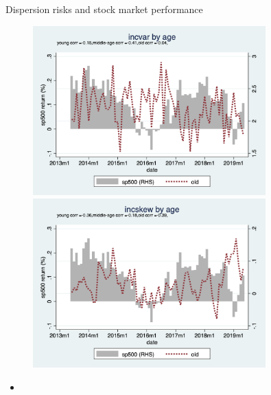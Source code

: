 \documentclass{beamer}
\begin{document}
\begin{frame}{Dispersion risks and stock market performance}
	\begin{figure}
		\centering
		\label{ts_stk_age_g}
		\includegraphics[width=0.8\textwidth, height=\0.4\textheight]{figures/ts_incvar_age_g_mean_stk} \\
		\includegraphics[width=0.8\textwidth, height=\0.4\textheight]{figures/ts_incskew_age_g_mean_stk} 
	\end{figure}
	\begin{itemize}
		\item 
	\end{itemize}
\end{frame}
\end{document}
